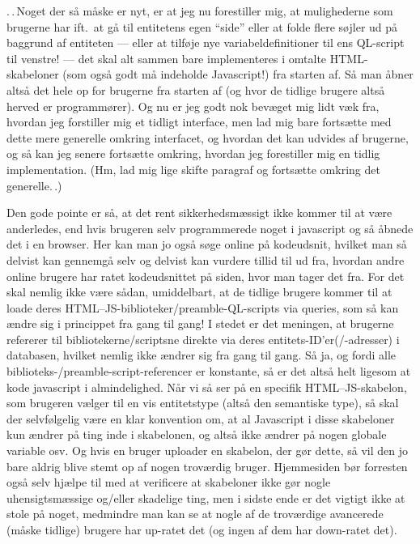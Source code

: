 \documentclass{report}
\begin{document}
.\,.\,Noget der så måske er nyt, er at jeg nu forestiller mig, at mulighederne som brugerne har ift.\ at gå til entitetens egen ``side'' eller at folde flere søjler ud på baggrund af entiteten --- eller at tilføje nye variabeldefinitioner til ens QL-script til venstre! --- det skal alt sammen bare implementeres i omtalte HTML-skabeloner (som også godt må indeholde Javascript!) fra starten af. Så man åbner altså det hele op for brugerne fra starten af (og hvor de tidlige brugere altså herved er programmører). Og nu er jeg godt nok bevæget mig lidt væk fra, hvordan jeg forstiller mig et tidligt interface, men lad mig bare fortsætte med dette mere generelle omkring interfacet, og hvordan det kan udvides af brugerne, og så kan jeg senere fortsætte omkring, hvordan jeg forestiller mig en tidlig implementation. (Hm, lad mig lige skifte paragraf og fortsætte omkring det generelle.\,.)

Den gode pointe er så, at det rent sikkerhedsmæssigt ikke kommer til at være anderledes, end hvis brugeren selv programmerede noget i javascript og så åbnede det i en browser. Her kan man jo også søge online på kodeudsnit, hvilket man så delvist kan gennemgå selv og delvist kan vurdere tillid til ud fra, hvordan andre online brugere har ratet kodeudsnittet på siden, hvor man tager det fra. For det skal nemlig ikke være sådan, umiddelbart, at de tidlige brugere kommer til at loade deres HTML--JS-biblioteker/preamble-QL-scripts via queries, som så kan ændre sig i princippet fra gang til gang! I stedet er det meningen, at brugerne refererer til bibliotekerne/scriptsne direkte via deres entitets-ID'er(/-adresser) i databasen, hvilket nemlig ikke ændrer sig fra gang til gang. Så ja, og fordi alle biblioteks-/preamble-script-referencer er konstante, så er det altså helt ligesom at kode javascript i almindelighed. Når vi så ser på en specifik HTML--JS-skabelon, som brugeren vælger til en vis entitetstype (altså den semantiske type), så skal der selvfølgelig være en klar konvention om, at al Javascript i disse skabeloner kun ændrer på ting inde i skabelonen, og altså ikke ændrer på nogen globale variable osv. Og hvis en bruger uploader en skabelon, der gør dette, så vil den jo bare aldrig blive stemt op af nogen troværdig bruger. Hjemmesiden bør forresten også selv hjælpe til med at verificere at skabeloner ikke gør nogle uhensigtsmæssige og/eller skadelige ting, men i sidste ende er det vigtigt ikke at stole på noget, medmindre man kan se at nogle af de troværdige avancerede (måske tidlige) brugere har up-ratet det (og ingen af dem har down-ratet det). 
\end{document}
